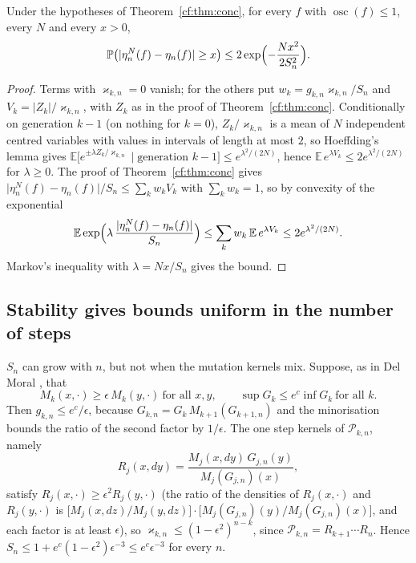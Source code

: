\begin{remark}\label{cf:rem:tail}
Under the hypotheses of Theorem~\ref{cf:thm:conc}, for every $f$ with $\operatorname{osc}(f)\le1$, every $N$ and every $x>0$,
\[
\mathbb P\bigl(\lvert\eta_n^N(f)-\eta_n(f)\rvert\ge x\bigr)\le2\exp\Bigl(-\frac{Nx^2}{2S_n^2}\Bigr).
\]
\end{remark}

\begin{proof}
Terms with $\varkappa_{k,n}=0$ vanish; for the others put $w_k=g_{k,n}\varkappa_{k,n}/S_n$ and $V_k=\lvert Z_k\rvert/\varkappa_{k,n}$, with $Z_k$ as in the proof of Theorem~\ref{cf:thm:conc}. Conditionally on generation $k-1$ (on nothing for $k=0$), $Z_k/\varkappa_{k,n}$ is a mean of $N$ independent centred variables with values in intervals of length at most $2$, so Hoeffding's lemma gives $\mathbb E\bigl[e^{\pm\lambda Z_k/\varkappa_{k,n}}\mid\text{generation }k-1\bigr]\le e^{\lambda^2/(2N)}$, hence $\mathbb E\,e^{\lambda V_k}\le2e^{\lambda^2/(2N)}$ for $\lambda\ge0$. The proof of Theorem~\ref{cf:thm:conc} gives $\lvert\eta_n^N(f)-\eta_n(f)\rvert/S_n\le\sum_kw_kV_k$ with $\sum_kw_k=1$, so by convexity of the exponential
\[
\mathbb E\exp\Bigl(\lambda\,\frac{\lvert\eta_n^N(f)-\eta_n(f)\rvert}{S_n}\Bigr)\le\sum_kw_k\,\mathbb E\,e^{\lambda V_k}\le2e^{\lambda^2/(2N)} .
\]
Markov's inequality with $\lambda=Nx/S_n$ gives the bound.
\end{proof}

\subsection{Stability gives bounds uniform in the number of steps}

$S_n$ can grow with $n$, but not when the mutation kernels mix. Suppose, as in Del Moral \cite{DelMoral04}, that
\[
M_{k}(x,\cdot)\ge\epsilon\,M_{k}(y,\cdot)\ \text{for all }x,y,\qquad \sup G_k\le e^{c}\inf G_k\ \text{for all }k .
\]
Then $g_{k,n}\le e^{c}/\epsilon$, because $G_{k,n}=G_k\,M_{k+1}(G_{k+1,n})$ and the minorisation bounds the ratio of the second factor by $1/\epsilon$. The one step kernels of $\mathcal P_{k,n}$, namely
\[
R_j(x,dy)=\frac{M_j(x,dy)\,G_{j,n}(y)}{M_j(G_{j,n})(x)},
\]
satisfy $R_j(x,\cdot)\ge\epsilon^2R_j(y,\cdot)$ (the ratio of the densities of $R_j(x,\cdot)$ and $R_j(y,\cdot)$ is $\bigl[M_j(x,dz)/M_j(y,dz)\bigr]\cdot\bigl[M_j(G_{j,n})(y)/M_j(G_{j,n})(x)\bigr]$, and each factor is at least $\epsilon$), so $\varkappa_{k,n}\le(1-\epsilon^2)^{n-k}$, since $\mathcal P_{k,n}=R_{k+1}\cdots R_n$. Hence $S_n\le1+e^c(1-\epsilon^2)\epsilon^{-3}\le e^{c}\epsilon^{-3}$ for every $n$.


